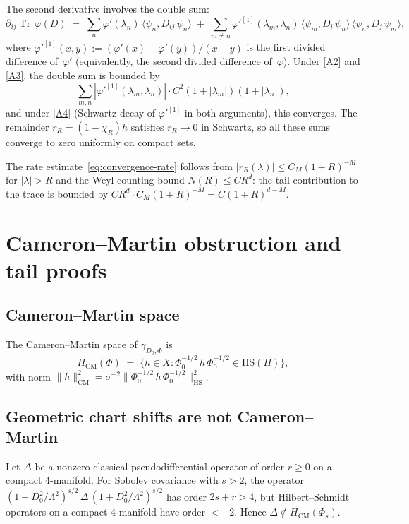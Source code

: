 \documentclass[12pt,a4paper]{article}
\theoremstyle{plain}
\theoremstyle{definition}
\theoremstyle{remark}
\newcommand{\Tr}{\operatorname{Tr}}
\newcommand{\HS}{\mathrm{HS}}
\newcommand{\Lam}{\Lambda}
\begin{document}
The second derivative involves the double sum:
\begin{equation}
  \partial_{ij}\Tr\,\varphi(D) \;=\;
  \sum_n \varphi'(\lambda_n)\,\langle\psi_n, D_{ij}\,\psi_n\rangle
  \;+\;
  \sum_{m \ne n} \varphi'^{[1]}(\lambda_m,\lambda_n)\,
  \langle\psi_m, D_i\,\psi_n\rangle\,
  \langle\psi_n, D_j\,\psi_m\rangle,
\end{equation}
where $\varphi'^{[1]}(x,y) := (\varphi'(x)-\varphi'(y))/(x-y)$ is the
first divided difference of~$\varphi'$ (equivalently, the second
divided difference of~$\varphi$).  Under \ref{A2} and \ref{A3}, the
double sum is bounded by
\[
  \sum_{m,n} |\varphi'^{[1]}(\lambda_m,\lambda_n)|\cdot
  C^2(1+|\lambda_m|)(1+|\lambda_n|),
\]
and under \ref{A4} (Schwartz decay of $\varphi'^{[1]}$ in both
arguments), this converges.  The remainder
$r_R = (1-\chi_R)h$ satisfies $r_R \to 0$ in Schwartz, so all
these sums converge to zero uniformly on compact sets.

The rate estimate~\eqref{eq:convergence-rate} follows from
$|r_R(\lambda)| \le C_M(1+R)^{-M}$ for $|\lambda| > R$ and
the Weyl counting bound $N(R) \le C R^d$: the tail contribution
to the trace is bounded by $C R^d \cdot C_M(1+R)^{-M} =
C(1+R)^{d-M}$.


\section{Cameron--Martin obstruction and tail proofs}
\label{app:cameron-martin}

\subsection{Cameron--Martin space}

The Cameron--Martin space of $\gamma_{D_0,\Phi}$ is
\begin{equation}
  H_{\mathrm{CM}}(\Phi)
  \;=\;
  \bigl\{h \in X : \Phi_0^{-1/2}\,h\,\Phi_0^{-1/2} \in \HS(H)\bigr\},
\end{equation}
with norm $\|h\|_{\mathrm{CM}}^2 = \sigma^{-2}
\|\Phi_0^{-1/2}\,h\,\Phi_0^{-1/2}\|_{\HS}^2$.

\subsection{Geometric chart shifts are not Cameron--Martin}

Let $\Delta$ be a nonzero classical pseudodifferential operator of
order $r \ge 0$ on a compact 4-manifold.  For Sobolev covariance with
$s > 2$, the operator
$(1+D_0^2/\Lam^2)^{s/2}\,\Delta\,(1+D_0^2/\Lam^2)^{s/2}$ has order
$2s + r > 4$, but Hilbert--Schmidt operators on a compact 4-manifold
have order $< -2$.  Hence $\Delta \notin H_{\mathrm{CM}}(\Phi_s)$.
\end{document}
